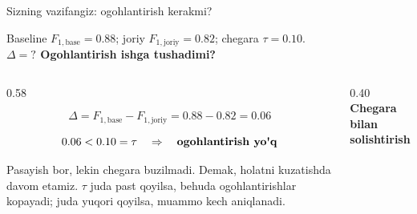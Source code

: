 \documentclass[aspectratio=169,11pt]{beamer}
\newcommand{\uzq}{\textquotesingle{}}   %
\begin{document}
\begin{frame}{Sizning vazifangiz: ogohlantirish kerakmi?}
  \small

  \begin{tcolorbox}[warnbox,title=Savol,top=2pt,bottom=2pt]
    Baseline $F_{1,\text{base}} = 0.88$;
    joriy $F_{1,\text{joriy}} = 0.82$;
    chegara $\tau = 0.10$.\\[3pt]
    \textbf{$\Delta = ?$ \qquad Ogohlantirish ishga tushadimi?}
  \end{tcolorbox}

  \pause
  \vspace{-5pt}

  \begin{columns}[T,totalwidth=\textwidth]
    \begin{column}{0.58\textwidth}
      \begin{tcolorbox}[okbox,title=Javob,top=2pt,bottom=2pt]
        \small
        \[
          \Delta
          =
          F_{1,\text{base}} - F_{1,\text{joriy}}
          =
          0.88 - 0.82
          =
          0.06
        \]

        \[
          0.06 < 0.10 = \tau
          \quad\Rightarrow\quad
          \textbf{ogohlantirish yo\uzq{}q}
        \]

        \footnotesize
        Pasayish bor, lekin chegara buzilmadi. Demak, holatni kuzatishda
        davom etamiz. $\tau$ juda past qo\uzq{}yilsa, behuda ogohlantirishlar
        ko\uzq{}payadi; juda yuqori qo\uzq{}yilsa, muammo kech aniqlanadi.
      \end{tcolorbox}
    \end{column}

    \begin{column}{0.40\textwidth}
      \centering
      {\footnotesize\textbf{Chegara bilan solishtirish}}\\[2pt]

\end{column}
\end{columns}
\end{frame}
\end{document}
